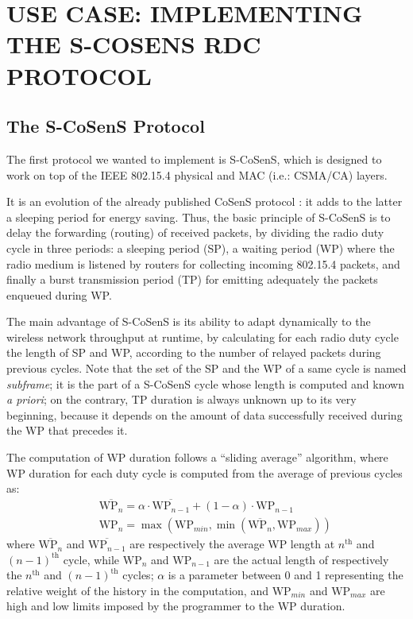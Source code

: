 \documentclass[a4paper,twoside]{article}
\begin{document}
\section{\uppercase{Use Case: implementing the S-CoSenS RDC protocol}}

\subsection{The S-CoSenS Protocol}

The first protocol we wanted to implement is S-CoSenS, which
is designed to work on top of the IEEE 802.15.4 physical and MAC
(i.e.: CSMA/CA) layers.

It is an evolution of the already published CoSenS protocol \cite{CosensConf}:
it adds to the latter a sleeping period for energy saving.
Thus, the basic principle of S-CoSenS is to delay the forwarding (routing)
of received packets, by dividing the radio duty cycle in three periods:
a sleeping period (SP), a waiting period (WP) where the radio medium
is listened by routers for collecting incoming 802.15.4 packets, and
finally a burst transmission period (TP) for emitting adequately
the packets enqueued during WP.

The main advantage of S-CoSenS is its ability to adapt dynamically to the
wireless network throughput at runtime, by calculating for each radio duty
cycle the length of SP and WP, according to the number of relayed
packets during previous cycles. Note that the set of the SP and the WP
of a same cycle is named \emph{subframe}; it is the part of a S-CoSenS
cycle whose length is computed and known \textit{a priori}; on the contrary,
TP duration is always unknown up to its very beginning, because it depends
on the amount of data successfully received during the WP that precedes it.

The computation of WP duration follows a ``sliding average'' algorithm,
where WP duration for each duty cycle is computed from the average
of previous cycles as:
\begin{eqnarray*}
&&
\overline{\mathrm{WP}_{n}} = \alpha \cdot \overline{\mathrm{WP}_{n-1}}
                + (1 - \alpha) \cdot \mathrm{WP}_{n-1}
\\ &&
\mathrm{WP}_{n} = \max ( \mathrm{WP}_{min},
                  \min ( \overline{\mathrm{WP}_{n}}, \mathrm{WP}_{max} ) )
\end{eqnarray*}
where $\overline{\mathrm{WP}_{n}}$ and $\overline{\mathrm{WP}_{n-1}}$
are respectively the average WP length at $n^{\mathrm{th}}$ and
$(n-1)^{\mathrm{th}}$ cycle, while $\mathrm{WP}_{n}$ and $\mathrm{WP}_{n-1}$
are the actual length of respectively the $n^{\mathrm{th}}$ and
$(n-1)^{\mathrm{th}}$ cycles; $\alpha$ is a parameter between 0 and 1
representing the relative weight of the history in the computation,
and $\mathrm{WP}_{min}$ and $\mathrm{WP}_{max}$ are high and low limits
imposed by the programmer to the WP duration.
\end{document}
